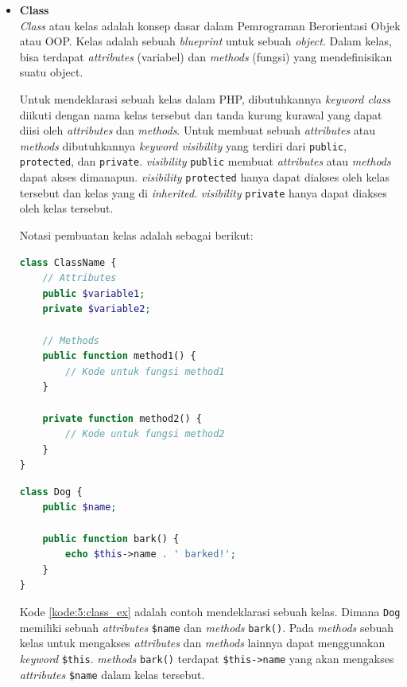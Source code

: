 \documentclass[a4paper,twoside]{article}
\begin{document}
\begin{enumerate}
\begin{itemize}
		      \item \textbf{Class} \\
		            \textit{Class} atau kelas adalah konsep dasar dalam Pemrograman Berorientasi Objek atau OOP. Kelas adalah sebuah \textit{blueprint} untuk sebuah \textit{object}. Dalam kelas, bisa terdapat \textit{attributes} (variabel) dan \textit{methods} (fungsi) yang mendefinisikan suatu object.

		            Untuk mendeklarasi sebuah kelas dalam PHP, dibutuhkannya \textit{keyword class} diikuti dengan nama kelas tersebut dan tanda kurung kurawal yang dapat diisi oleh \textit{attributes} dan \textit{methods}. Untuk membuat sebuah \textit{attributes} atau \textit{methods} dibutuhkannya \textit{keyword visibility} yang terdiri dari \verb|public|, \verb|protected|, dan \verb|private|. \textit{visibility} \verb|public| membuat \textit{attributes} atau \textit{methods} dapat akses dimanapun. \textit{visibility} \verb|protected| hanya dapat diakses oleh kelas tersebut dan kelas yang di \textit{inherited}. \textit{visibility} \verb|private| hanya dapat diakses oleh kelas tersebut.

		            Notasi pembuatan kelas adalah sebagai berikut:

		            \begin{lstlisting}[language={php}, caption={Notasi Kelas}, label={kode:5:class_notasi}]
class ClassName {
	// Attributes
    public $variable1;
    private $variable2;

    // Methods
    public function method1() {
        // Kode untuk fungsi method1
    }

    private function method2() {
        // Kode untuk fungsi method2
    }
}
					\end{lstlisting}

		            \begin{lstlisting}[language={php}, caption={Contoh Kelas}, label={kode:5:class_ex}]
class Dog {
	public $name;
	
	public function bark() {
		echo $this->name . ' barked!';
	}
}
					\end{lstlisting}

		            Kode \ref{kode:5:class_ex} adalah contoh mendeklarasi sebuah kelas. Dimana \verb|Dog| memiliki sebuah \textit{attributes} \verb|$name| dan \textit{methods} \verb|bark()|. Pada \textit{methods} sebuah kelas untuk mengakses \textit{attributes} dan \textit{methods} lainnya dapat menggunakan \textit{keyword} \verb|$this|. \textit{methods} \verb|bark()| terdapat \verb|$this->name| yang akan mengakses \textit{attributes} \verb|$name| dalam kelas tersebut.


\end{itemize}
\end{enumerate}
\end{document}
